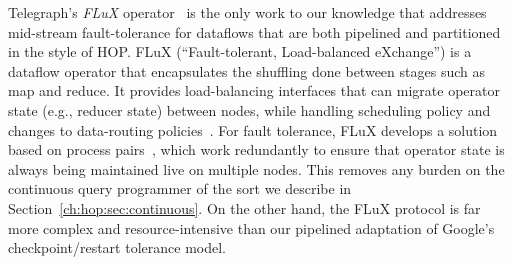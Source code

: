 Telegraph's \emph{FLuX} operator~\cite{flux-ft,flux-lb} is the only work to our
knowledge that addresses mid-stream fault-tolerance for dataflows that are both
pipelined and partitioned in the style of HOP\@. FLuX (``Fault-tolerant,
Load-balanced eXchange'') is a dataflow operator that encapsulates the shuffling
done between stages such as map and reduce.  It provides load-balancing
interfaces that can migrate operator state (e.g., reducer state) between nodes,
while handling scheduling policy and changes to data-routing
policies~\cite{flux-lb}.  For fault tolerance, FLuX develops a solution based on
process pairs~\cite{flux-ft}, which work redundantly to ensure that operator
state is always being maintained live on multiple nodes.  This removes any
burden on the continuous query programmer of the sort we describe in
Section~\ref{ch:hop:sec:continuous}.  On the other hand, the FLuX protocol is far more
complex and resource-intensive than our pipelined adaptation of Google's
checkpoint/restart tolerance model.

